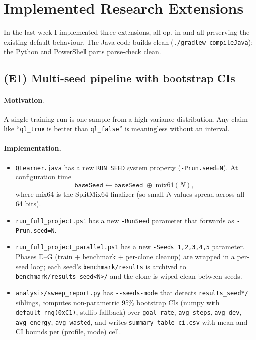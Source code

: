 \documentclass[conference]{IEEEtran}
\begin{document}
\section{Implemented Research Extensions}
\label{sec:extensions}

In the last week I implemented three extensions, all opt-in and all
preserving the existing default behaviour. The Java code builds clean
(\verb|./gradlew compileJava|); the Python and PowerShell parts
parse-check clean.

\subsection{(E1) Multi-seed pipeline with bootstrap CIs}
\label{sec:ext-seeds}

\paragraph{Motivation.} A single training run is one sample from a
high-variance distribution. Any claim like ``\texttt{ql\_true} is
better than \texttt{ql\_false}'' is meaningless without an interval.

\paragraph{Implementation.}
\begin{itemize}
  \item \verb|QLearner.java| has a new \verb|RUN_SEED| system property
        (\verb|-Prun.seed=N|). At configuration time
        $$
        \texttt{baseSeed} \leftarrow \texttt{baseSeed}\;\oplus\;\text{mix64}(N),
        $$
        where mix64 is the SplitMix64 finalizer (so small $N$ values
        spread across all 64 bits).
  \item \verb|run_full_project.ps1| has a new \verb|-RunSeed| parameter
        that forwards as \verb|-Prun.seed=N|.
  \item \verb|run_full_project_parallel.ps1| has a new \verb|-Seeds 1,2,3,4,5|
        parameter. Phases D--G (train + benchmark + per-clone cleanup)
        are wrapped in a per-seed loop; each seed's
        \verb|benchmark/results| is archived to
        \verb|benchmark/results_seed<N>/| and the clone is wiped clean
        between seeds.
  \item \verb|analysis/sweep_report.py| has \verb|--seeds-mode| that
        detects \verb|results_seed*/| siblings, computes
        non-parametric 95\% bootstrap CIs (numpy with
        \verb|default_rng(0xC1)|, stdlib fallback) over
        \verb|goal_rate|, \verb|avg_steps|, \verb|avg_dev|,
        \verb|avg_energy|, \verb|avg_wasted|, and writes
        \verb|summary_table_ci.csv| with mean and CI bounds per
        (profile, mode) cell.
\end{itemize}
\end{document}
